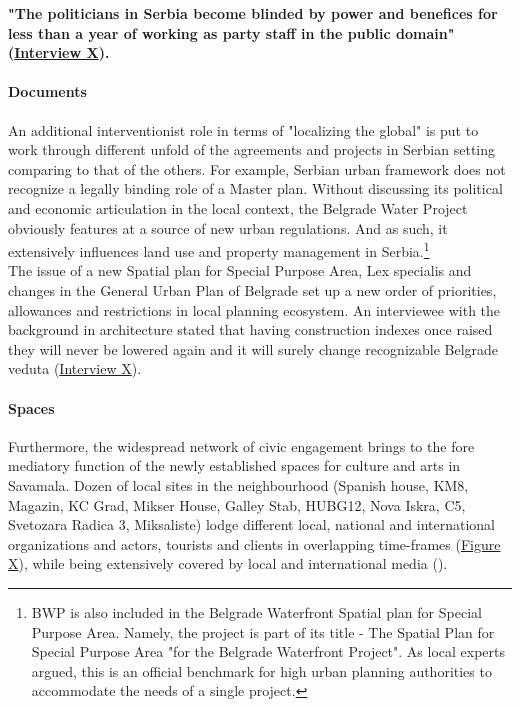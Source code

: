 \documentclass[11pt]{report}
\begin{document}
\textbf{"The politicians in Serbia become blinded by power and benefices for less than a year of working as party staff in the public domain" 
(\href{InterviewX}{Interview X}).}

\paragraph{Documents}

An additional interventionist role in terms of "localizing the global" \href{ref}{\citealt{latour_reassembling_2005}} is put to work through different unfold of the agreements and projects in Serbian setting comparing to that of the others.
For example, Serbian urban framework does not recognize a legally binding role of a Master plan. Without discussing its political and economic articulation in the local context, the Belgrade Water Project obviously features at a source of new urban regulations.
And as such, it extensively influences land use and property management in Serbia.\footnote
{BWP is also included in the Belgrade Waterfront Spatial plan for Special Purpose Area.
Namely, the project is part of its title - The Spatial Plan for Special Purpose Area "for the Belgrade Waterfront Project". As local experts argued, this is an official benchmark for high urban planning authorities to accommodate the needs of a single project.}
\\
The issue of a new Spatial plan for Special Purpose Area, Lex specialis and changes in the General Urban Plan of Belgrade set up a new order of priorities, allowances and restrictions in local planning ecosystem. An interviewee with the background in architecture stated that having construction indexes once raised they will never be lowered again and it will surely change recognizable Belgrade veduta (\href{InterviewX}{Interview X}).


\paragraph{Spaces}

Furthermore, the widespread network of civic engagement brings to the fore mediatory function of the newly established spaces for culture and arts in Savamala.
Dozen of local sites in the neighbourhood
(Spanish house, KM8, Magazin, KC Grad, Mikser House, Galley Stab, HUBG12, Nova Iskra, C5, Svetozara Radica 3, Miksaliste) lodge different local, national and international organizations and actors, tourists and clients in overlapping time-frames (\href{ref}{Figure X}),
while being extensively covered by local and international media
(\cite{add references from media sources archive}).
\end{document}
